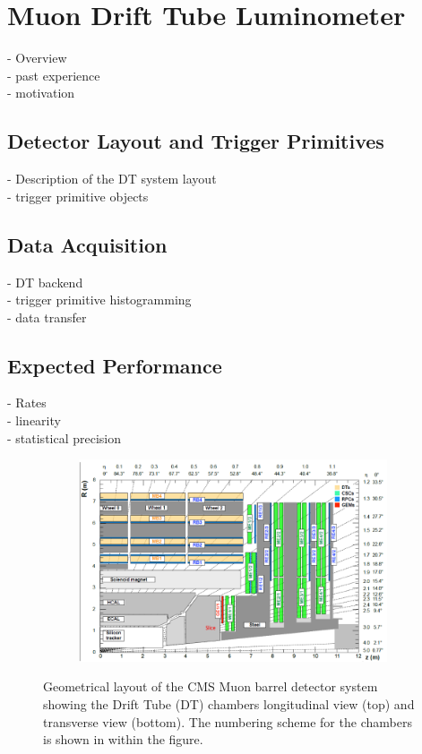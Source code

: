 \chapter{Muon Drift Tube Luminometer}

- Overview \\
- past experience \\
- motivation


\cite{LUM-17-001}

\section{Detector Layout and Trigger Primitives}
- Description of the DT system layout \\
- trigger primitive objects

\cite{CERN-LHCC-2017-012}

\section{Data Acquisition}
- DT backend \\
- trigger primitive histogramming \\
- data transfer

\section{Expected Performance}
- Rates \\ 
- linearity \\
- statistical precision 


\clearpage

\begin{figure}[hbtp]
\centering
\begin{subfigure}
  \centering
  \includegraphics[width=.9\linewidth]{tex/Part2/fig/DT/DT-longitudinal.png}
\end{subfigure}
\caption{
  Geometrical layout of the CMS Muon barrel detector system showing the Drift Tube (DT) chambers longitudinal view (top) and transverse view (bottom).
  The numbering scheme for the chambers is shown in within the figure.
}
\label{fig:DT_layout}
\end{figure}


